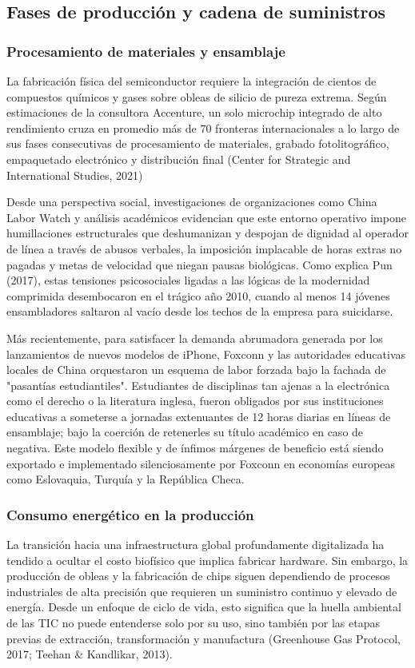 \documentclass[stu,12pt,a4paper]{apa7}
\begin{document}
    \subsection{Fases de producción y cadena de suministros}

    \subsubsection{Procesamiento de materiales y ensamblaje}
La fabricación física del semiconductor requiere la integración de cientos de compuestos químicos y gases sobre obleas de silicio de pureza extrema. Según estimaciones de la consultora Accenture, un solo microchip integrado de alto rendimiento cruza en promedio más de 70 fronteras internacionales a lo largo de sus fases consecutivas de procesamiento de materiales, grabado fotolitográfico, empaquetado electrónico y distribución final (Center for Strategic and International Studies, 2021)

Desde una perspectiva social, investigaciones de organizaciones como China Labor Watch y análisis académicos evidencian que este entorno operativo impone humillaciones estructurales que deshumanizan y despojan de dignidad al operador de línea a través de abusos verbales, la imposición implacable de horas extras no pagadas y metas de velocidad que niegan pausas biológicas. Como explica Pun (2017), estas tensiones psicosociales ligadas a las lógicas de la modernidad comprimida desembocaron en el trágico año 2010, cuando al menos 14 jóvenes ensambladores saltaron al vacío desde los techos de la empresa para suicidarse.

Más recientemente, para satisfacer la demanda abrumadora generada por los lanzamientos de nuevos modelos de iPhone, Foxconn y las autoridades educativas locales de China orquestaron un esquema de labor forzada bajo la fachada de "pasantías estudiantiles".  Estudiantes de disciplinas tan ajenas a la electrónica como el derecho o la literatura inglesa, fueron obligados por sus instituciones educativas a someterse a jornadas extenuantes de 12 horas diarias en líneas de ensamblaje; bajo la coerción de retenerles su título académico en caso de negativa. Este modelo flexible y de ínfimos márgenes de beneficio está siendo exportado e implementado silenciosamente por Foxconn en economías europeas como Eslovaquia, Turquía y la República Checa.

    \subsubsection{Consumo energético en la producción}
    La transición hacia una infraestructura global profundamente digitalizada ha tendido a ocultar el costo biofísico que implica fabricar hardware. Sin embargo, la producción de obleas y la fabricación de chips siguen dependiendo de procesos industriales de alta precisión que requieren un suministro continuo y elevado de energía. Desde un enfoque de ciclo de vida, esto significa que la huella ambiental de las TIC no puede entenderse solo por su uso, sino también por las etapas previas de extracción, transformación y manufactura (Greenhouse Gas Protocol, 2017; Teehan \& Kandlikar, 2013).
    
\end{document}
